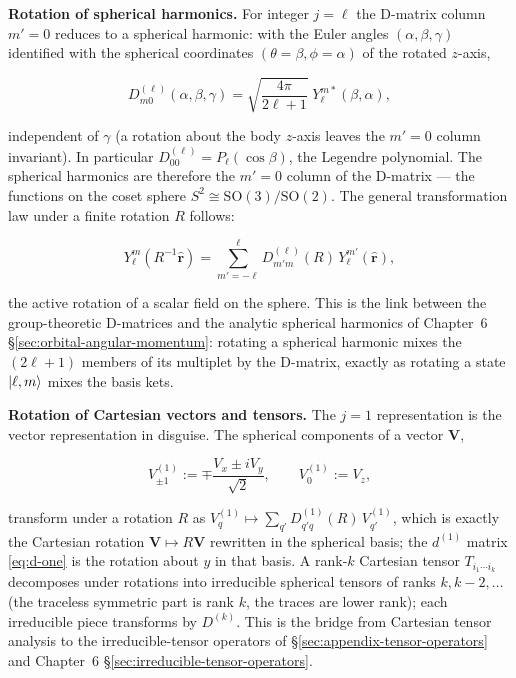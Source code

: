 \medskip\noindent\textbf{Rotation of spherical harmonics.} For integer $j=\ell$ the D-matrix column $m'=0$ reduces to a spherical harmonic: with the Euler angles $(\alpha,\beta,\gamma)$ identified with the spherical coordinates $(\theta=\beta,\phi=\alpha)$ of the rotated $z$-axis,
\begin{linenomath}
\begin{equation}
D^{(\ell)}_{m0}(\alpha,\beta,\gamma)=\sqrt{\frac{4\pi}{2\ell+1}}\;Y_{\ell}^{m*}(\beta,\alpha),
\label{eq:D-to-Y}
\end{equation}
\end{linenomath}
independent of $\gamma$ (a rotation about the body $z$-axis leaves the $m'=0$ column invariant). In particular $D^{(\ell)}_{00}=P_{\ell}(\cos\beta)$, the Legendre polynomial. The spherical harmonics are therefore the $m'=0$ column of the D-matrix --- the functions on the coset sphere $S^{2}\cong\mathrm{SO}(3)/\mathrm{SO}(2)$. The general transformation law under a finite rotation $R$ follows:
\begin{linenomath}
\begin{equation}
Y_{\ell}^{m}(R^{-1}\hat{\bm r})=\sum_{m'=-\ell}^{\ell}D^{(\ell)}_{m'm}(R)\,Y_{\ell}^{m'}(\hat{\bm r}),
\label{eq:Ylm-rotation}
\end{equation}
\end{linenomath}
the active rotation of a scalar field on the sphere. This is the link between the group-theoretic D-matrices and the analytic spherical harmonics of Chapter~6 \S\ref{sec:orbital-angular-momentum}: rotating a spherical harmonic mixes the $(2\ell+1)$ members of its multiplet by the D-matrix, exactly as rotating a state $\ket{\ell,m}$ mixes the basis kets.

\medskip\noindent\textbf{Rotation of Cartesian vectors and tensors.} The $j=1$ representation is the vector representation in disguise. The spherical components of a vector $\bm V$,
\begin{linenomath}
\begin{equation*}
V^{(1)}_{\pm1}:=\mp\frac{V_{x}\pm iV_{y}}{\sqrt2},\qquad V^{(1)}_{0}:=V_{z},
\end{equation*}
\end{linenomath}
transform under a rotation $R$ as $V^{(1)}_{q}\mapsto\sum_{q'}D^{(1)}_{q'q}(R)\,V^{(1)}_{q'}$, which is exactly the Cartesian rotation $\bm V\mapsto R\bm V$ rewritten in the spherical basis; the $d^{(1)}$ matrix \eqref{eq:d-one} is the rotation about $y$ in that basis. A rank-$k$ Cartesian tensor $T_{i_{1}\cdots i_{k}}$ decomposes under rotations into irreducible spherical tensors of ranks $k,k-2,\ldots$ (the traceless symmetric part is rank $k$, the traces are lower rank); each irreducible piece transforms by $D^{(k)}$. This is the bridge from Cartesian tensor analysis to the irreducible-tensor operators of \S\ref{sec:appendix-tensor-operators} and Chapter~6 \S\ref{sec:irreducible-tensor-operators}.

